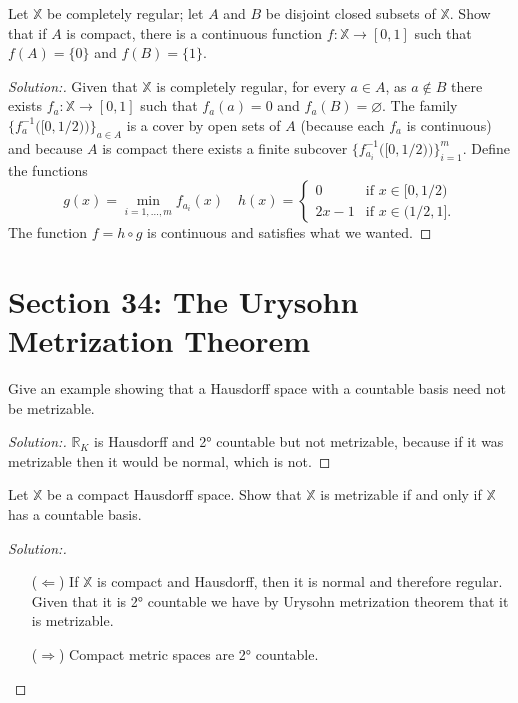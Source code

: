 \documentclass[a4paper,12pt, reqno]{article}
\theoremstyle{definition}
\newenvironment{exerr}[1]{
  \renewcommand\theexeralt{#1}
  \exeralt
}{\endexeralt}
\newenvironment{solution}{\begin{proof}[Solution:]}{\end{proof}}
\newcommand{\R}{\mathbb{R}}
\newcommand{\X}{\mathbb{X}}
\begin{document}
\begin{exerr}{8}
  Let $\X$ be completely regular; let $A$ and $B$ be disjoint closed subsets of $\X$. Show that if $A$ is compact, there is a continuous function $f:\X\to[0,1]$ such that $f(A)= \{ 0 \}$ and $f(B)=\{ 1 \}$.
\end{exerr}
\begin{solution}
  Given that $\X$ is completely regular, for every $a\in A$, as $a\notin B$ there exists $f_{a}: \X\to[0,1]$ such that $f_{a}(a) = 0$ and $f_{a}(B)= \varnothing$. The family $\{ f_{a}^{-1}\big( [0,1/2) \big) \}_{a\in A}$ is a cover by open sets of $A$ (because each $f_{a}$ is continuous) and because $A$ is compact there exists a finite subcover $\{ f_{a_{i}}^{-1}\big( [0,1/2) \big) \}_{i=1}^m$. Define the functions
  \begin{equation*}
    g(x) = \min_{i=1,\dots,m}f_{a_{i}}(x) \quad h(x) = \begin{cases}
      0 &\text{if }x\in[0,1/2)\\
      2x-1 &\text{if }x\in(1/2,1].
    \end{cases}
  \end{equation*}
  The function $f = h\circ g$ is continuous and satisfies what we wanted.
\end{solution}

\section*{Section 34: The Urysohn Metrization Theorem}


\begin{exerr}{1}
  Give an example showing that a Hausdorff space with a countable basis need not be metrizable.
\end{exerr}
\begin{solution}
  $\R_{K}$ is Hausdorff and 2° countable but not metrizable, because if it was metrizable then it would be normal, which is not.
\end{solution}

\begin{exerr}{3}
  Let $\X$ be a compact Hausdorff space. Show that $\X$ is metrizable if and only if $\X$ has a countable basis.
\end{exerr}
\begin{solution}\hfill
  \begin{itemize}
    \item[($\Longleftarrow$)] If $\X$ is compact and Hausdorff, then it is normal and therefore regular. Given that it is 2° countable we have by Urysohn metrization theorem that it is metrizable.
    \item[($\Longrightarrow$)] Compact metric spaces are 2° countable.
  \end{itemize}
\end{solution}
\end{document}
